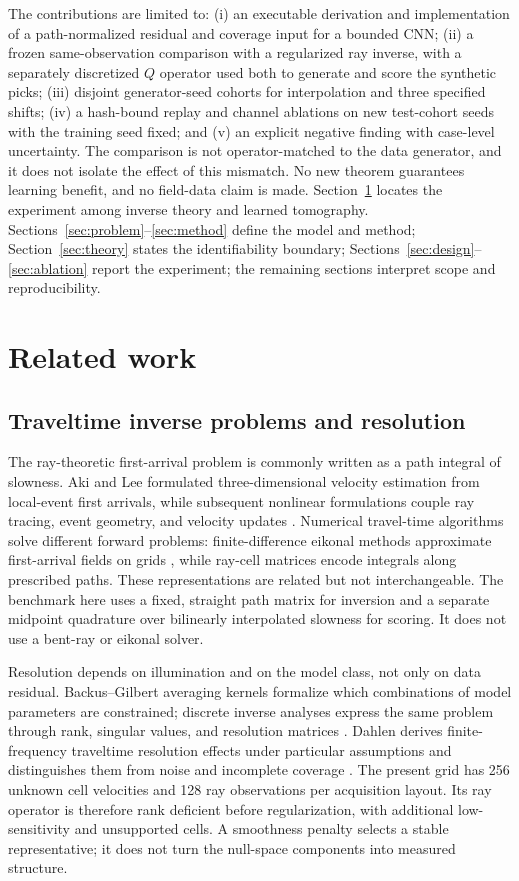 \documentclass[11pt]{article}
\begin{document}
The contributions are limited to: (i) an executable derivation and implementation of a path-normalized residual and coverage input for a bounded CNN; (ii) a frozen same-observation comparison with a regularized ray inverse, with a separately discretized $Q$ operator used both to generate and score the synthetic picks; (iii) disjoint generator-seed cohorts for interpolation and three specified shifts; (iv) a hash-bound replay and channel ablations on new test-cohort seeds with the training seed fixed; and (v) an explicit negative finding with case-level uncertainty. The comparison is not operator-matched to the data generator, and it does not isolate the effect of this mismatch. No new theorem guarantees learning benefit, and no field-data claim is made. Section~\ref{sec:related} locates the experiment among inverse theory and learned tomography. Sections~\ref{sec:problem}--\ref{sec:method} define the model and method; Section~\ref{sec:theory} states the identifiability boundary; Sections~\ref{sec:design}--\ref{sec:ablation} report the experiment; the remaining sections interpret scope and reproducibility.

\section{Related work}
\label{sec:related}
\subsection{Traveltime inverse problems and resolution}
\label{sec:related-inverse}
The ray-theoretic first-arrival problem is commonly written as a path integral of slowness. Aki and Lee formulated three-dimensional velocity estimation from local-event first arrivals, while subsequent nonlinear formulations couple ray tracing, event geometry, and velocity updates \cite{AkiLee1976,AkiChristofferson1977,Hole1992}. Numerical travel-time algorithms solve different forward problems: finite-difference eikonal methods approximate first-arrival fields on grids \cite{Vidale1988,Podvin1991,MoHarris2002}, while ray-cell matrices encode integrals along prescribed paths. These representations are related but not interchangeable. The benchmark here uses a fixed, straight path matrix for inversion and a separate midpoint quadrature over bilinearly interpolated slowness for scoring. It does not use a bent-ray or eikonal solver.

Resolution depends on illumination and on the model class, not only on data residual. Backus--Gilbert averaging kernels formalize which combinations of model parameters are constrained; discrete inverse analyses express the same problem through rank, singular values, and resolution matrices \cite{BackusGilbert1968,Menke2018,Aster2018}. Dahlen derives finite-frequency traveltime resolution effects under particular assumptions and distinguishes them from noise and incomplete coverage \cite{Dahlen2004}. The present grid has 256 unknown cell velocities and 128 ray observations per acquisition layout. Its ray operator is therefore rank deficient before regularization, with additional low-sensitivity and unsupported cells. A smoothness penalty selects a stable representative; it does not turn the null-space components into measured structure.
\end{document}
